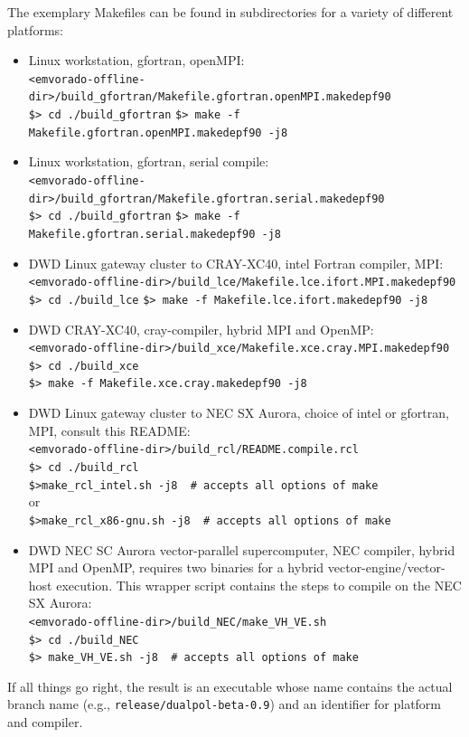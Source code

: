 \documentclass[10pt,a4paper,twoside,headinclude,footinclude,parskip=half]{scrartcl}
\newcommand{\paramform}[1]{\mbox{\texttt{#1}}\xspace}%
\begin{document}
The exemplary Makefiles can be found in subdirectories for a variety of different platforms:
\begin{itemize}
\item Linux workstation, gfortran, openMPI:\\
  \verb|<emvorado-offline-dir>/build_gfortran/Makefile.gfortran.openMPI.makedepf90|\\
  \verb|$> cd ./build_gfortran|
  \verb|$> make -f Makefile.gfortran.openMPI.makedepf90 -j8|
\item Linux workstation, gfortran, serial compile:\\
  \verb|<emvorado-offline-dir>/build_gfortran/Makefile.gfortran.serial.makedepf90|\\
  \verb|$> cd ./build_gfortran|
  \verb|$> make -f Makefile.gfortran.serial.makedepf90 -j8|
\item DWD Linux gateway cluster to CRAY-XC40, intel Fortran compiler, MPI:\\
  \verb|<emvorado-offline-dir>/build_lce/Makefile.lce.ifort.MPI.makedepf90|\\
  \verb|$> cd ./build_lce|
  \verb|$> make -f Makefile.lce.ifort.makedepf90 -j8|
\item DWD CRAY-XC40, cray-compiler, hybrid MPI and OpenMP:\\
  \verb|<emvorado-offline-dir>/build_xce/Makefile.xce.cray.MPI.makedepf90|\\
  \verb|$> cd ./build_xce|\\
  \verb|$> make -f Makefile.xce.cray.makedepf90 -j8|
\item DWD Linux gateway cluster to NEC SX Aurora, choice of intel or gfortran, MPI, consult this README:\\
  \verb|<emvorado-offline-dir>/build_rcl/README.compile.rcl|\\
  \verb|$> cd ./build_rcl|\\
  \verb|$>make_rcl_intel.sh -j8  # accepts all options of make|\\
  \phantom{.}\qquad or\\
  \verb|$>make_rcl_x86-gnu.sh -j8  # accepts all options of make|
\item DWD NEC SC Aurora vector-parallel supercomputer, NEC compiler, hybrid MPI and OpenMP, requires two binaries for a hybrid vector-engine/vector-host execution.
  This wrapper script contains the steps to compile on the NEC SX Aurora:\\
  \verb|<emvorado-offline-dir>/build_NEC/make_VH_VE.sh|\\
  \verb|$> cd ./build_NEC|\\
  \verb|$> make_VH_VE.sh -j8  # accepts all options of make| 
\end{itemize}
If all things go right, the result is an executable whose name contains the actual branch name (e.g., \paramform{release/dualpol-beta-0.9}) and an identifier for platform and compiler.
\end{document}
